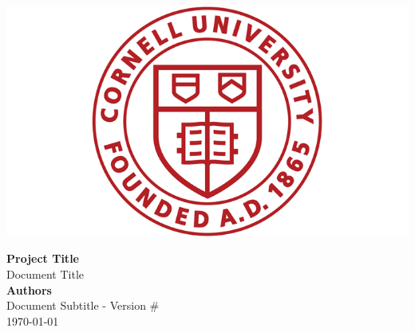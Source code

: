 \documentclass[letterpaper, 10 pt, journal, twoside]{article}
\begin{document}
	

	\begin{vwcol}[widths={0.3,0.7},sep=0.5cm, justify=flush,rule=0.2pt,indent=0em] 
		\vspace{1cm}
		\includegraphics[width=0.3\linewidth]{figures/logo.png} 
		
		\large{\textbf{Project Title}}\\
		Document Title\\
		\large{\textbf{Authors}}\\
		Document Subtitle - Version \#\\
		\today 
	\end{vwcol} 

\vspace{5mm}





\small


\end{document}
